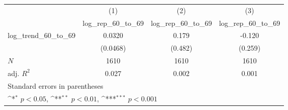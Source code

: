 {
\def\sym#1{\ifmmode^{#1}\else\(^{#1}\)\fi}
\begin{tabular}{l*{3}{c}}
\hline\hline
            &\multicolumn{1}{c}{(1)}&\multicolumn{1}{c}{(2)}&\multicolumn{1}{c}{(3)}\\
            &\multicolumn{1}{c}{log\_rep\_60\_to\_69}&\multicolumn{1}{c}{log\_rep\_60\_to\_69}&\multicolumn{1}{c}{log\_rep\_60\_to\_69}\\
\hline
log\_trend\_60\_to\_69&      0.0320         &       0.179         &      -0.120         \\
            &    (0.0468)         &     (0.482)         &     (0.259)         \\
\hline
\(N\)       &        1610         &        1610         &        1610         \\
adj. \(R^{2}\)&       0.027         &       0.002         &       0.001         \\
\hline\hline
\multicolumn{4}{l}{\footnotesize Standard errors in parentheses}\\
\multicolumn{4}{l}{\footnotesize \sym{*} \(p<0.05\), \sym{**} \(p<0.01\), \sym{***} \(p<0.001\)}\\
\end{tabular}
}
